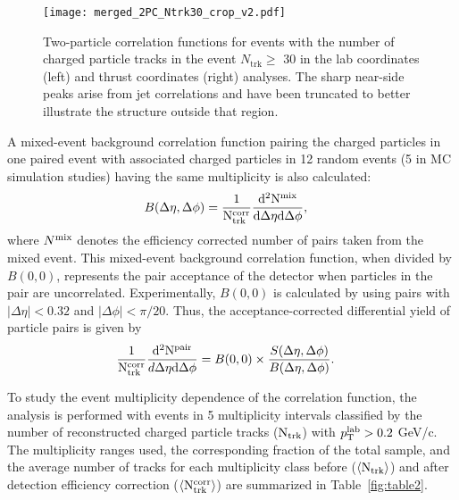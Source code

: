 \documentclass[aps,prl,twocolumn,superscriptaddress,groupedaddress]{revtex4}  %
\begin{document}
\begin{figure}[t]%
    \centering
    \texttt{[image: merged\_2PC\_Ntrk30\_crop\_v2.pdf]}%
    \caption{Two-particle correlation functions for events with the number of charged particle tracks in the event $N_{\mathrm{trk}}\geq$ 30 in the lab coordinates (left) and thrust coordinates (right) analyses. The sharp near-side peaks arise from jet correlations and have been truncated to better illustrate the structure outside that region.}%
    \label{fig:2PC_BeamThrust}%
\end{figure}

A mixed-event background correlation function pairing the charged particles in one paired event with associated charged particles in 12 random events (5 in MC simulation studies) having the same multiplicity is also calculated:
 \begin{align}
   B(\Delta\eta,\Delta\phi) &= \frac{1}{\rm N_{trk}^{corr}}\frac{\rm d^2 N^{\rm mix}}{\rm d\Delta\eta \rm d\Delta\phi},
\end{align}
where $N^{\rm mix}$ denotes the efficiency corrected number of pairs taken from the mixed event. This mixed-event background correlation function, when divided by $B(0,0)$, represents the pair acceptance of the detector when particles in the pair are uncorrelated. Experimentally, $B(0,0)$ is calculated by using pairs with $|\Delta\eta|<0.32$ and $|\Delta\phi|<\pi/20$. Thus, the acceptance-corrected differential yield of particle pairs is given by
 \begin{align}
    \frac{1}{\rm N_{\rm trk}^{corr}}\frac{\rm d^2N^{pair}}{d\Delta\eta  \rm d\Delta\phi} &= B(0,0) \times \frac{S(\Delta\eta, \Delta\phi)}{B(\Delta\eta, \Delta\phi)}.
\end{align} \par
To study the event multiplicity dependence of the correlation function, the analysis is performed with events in 5 multiplicity intervals classified by the number of reconstructed charged particle tracks ($\rm N_\text{trk}$) with $p_{\rm T}^{\rm lab}>0.2$ GeV/c. The multiplicity ranges used, the corresponding fraction of the total sample, and the average number of tracks for each multiplicity class before ($\langle {\rm N_{\text{trk}}}\rangle$) and after detection efficiency correction ($\langle {\rm N_{\text{trk}}^{\text{corr}}}\rangle$) are summarized in Table~\ref{fig:table2}.
\end{document}
